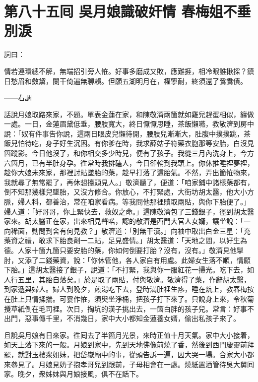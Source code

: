 
\chapter*{第八十五囘 吳月娘識破奸情 春梅姐不垂別淚}


詞曰：

\begin{myquote}
情若連環總不解，無端招引旁人恠。好事多磨成又敗，應難捱，相冷眼誰揪採？鎮日愁眉和斂黛，闌干倚遍無聊賴。但願五湖明月在，權寧耐，終須還了鴛鴦債。

——右調
\end{myquote}

話說月娘取路來家，不題。單表金蓮在家，和陳敬濟兩箇就如雞兒趕蛋相似，纏做一處。一日，金蓮眉黛低垂，腰肢寬大，終日懨懨思睡，茶飯懶嚥，教敬濟到房中說：「奴有件事告你說，這兩日眼皮兒懶待開，腰肢兒漸漸大，肚腹中撲撲跳，茶飯兒怕待吃，身子好生沉困。有你爹在時，我求薛姑子符藥衣胞那等安胎，白沒見箇蹤影。今日他沒了，和你相交多少時兒，便有了孩子。{}我從三月內洗身上，今方六箇月，已有半肚身孕。徃常時我排磕人，今日卻輪到我頭上。你休推睡裡夢裡，趁你大娘未來家，那裡討貼墜胎的藥，趁早打落了這胎氣。不然，弄出箇恠物來，我就尋了無常罷了，再休想擡頭見人。」敬濟聽了，便道：「咱家鋪中諸樣藥都有，倒不知那幾樣兒墜胎，又沒方修合。你放心，不打緊處，大街坊胡太醫，他大小方脈，婦人科，都善治，常在咱家看病。等我問他那裡贖取兩貼，與你下胎便了。」婦人道：「好哥哥，你上緊快去，救奴之命。」這陳敬濟包了三錢銀子，徑到胡太醫家來。胡太醫正在家，出來相見聲喏，認的敬濟是西門大官人女婿，讓坐說：「一向稀面，動問到舍有何見教？」敬濟道：「別無干瀆。」向袖中取出白金三星：「充藥資之禮，敢求下胎良劑一二貼，足見盛情。」胡太醫道：「天地之間，以好生為德。人家十箇九箇只要安胎的藥，你如何倒要打胎？沒有，沒有。」敬濟見他掣肘，又添了二錢藥資，說：「你休管他，各人家自有用處。此婦女生落不順，情願下胎。」這胡太醫接了銀子，說道：「不打緊，我與你一服紅花一掃光。吃下去，如人行五里，其胎自落矣。」於是取了兩貼，付與敬濟。敬濟得了藥，作辭胡太醫，到家遞與婦人。婦人到晚夕，煎湯吃下去，登時滿肚裡生疼，睡在炕上，教春梅按在肚上只情揉揣。可霎作恠，須臾坐淨桶，把孩子打下來了。只說身上來，令秋菊攪草紙倒在毛司裡。次日，掏坑的漢子挑出去，一箇白胖的孩子兒。常言：好事不出門，惡事傳千里，不消幾日，家中大小都知金蓮養女婿，偷出私孩子來了。

且說吳月娘有日來家。徃囘去了半箇月光景，來時正值十月天氣。家中大小接着，如天上落下來的一般。{}月娘到家中，先到天地佛像前燒了香，然後到西門慶靈前拜罷，就對玉樓衆姐妹，把岱嶽廟中的事，從頭告訴一遍，因大哭一場。{}合家大小都來叅見了。月娘見奶子抱孝哥兒到跟前，子母相會在一處。燒紙置酒管待吳大舅囘家。晚夕，衆姊妹與月娘接風，俱不在話下。

